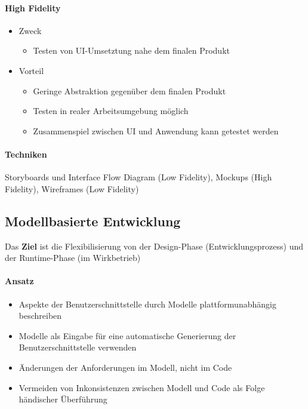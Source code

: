\documentclass
[
	8pt,		%
	ngerman,	%
	a4paper,	%
	landscape,	%
	final		%
]{extarticle}
\begin{document}
\begin{multicols*}{4}
{\begin{multicols*}{2}
			\paragraph{High Fidelity}
			\begin{itemize}
				\item Zweck
				      \begin{itemize}[leftmargin=4pt,nolistsep]
					      \item Testen von UI-Umsetztung nahe dem finalen
					            Produkt
				      \end{itemize}
				\item Vorteil
				      \begin{itemize}[leftmargin=4pt,nolistsep]
					      \item Geringe Abstraktion gegenüber dem finalen
					            Produkt
					      \item Testen in realer Arbeitsumgebung möglich
					      \item Zusammenspiel zwischen UI und Anwendung kann
					            getestet werden
				      \end{itemize}
			\end{itemize}
		\end{multicols*}
	}
	\paragraph{Techniken} Storyboards und Interface Flow Diagram (Low Fidelity),
	Mockups (High Fidelity), Wireframes (Low Fidelity)
	\subsection{Modellbasierte Entwicklung}
	Das \textbf{Ziel} ist die Flexibilisierung von der Design-Phase
	(Entwicklungsprozess) und der Runtime-Phase (im Wirkbetrieb)
	\paragraph{Ansatz}
	\begin{itemize}
		\item Aspekte der Benutzerschnittstelle durch Modelle
		      plattformunabhängig beschreiben
		\item Modelle als Eingabe für eine automatische Generierung der
		      Benutzerschnittstelle verwenden
		\item Änderungen der Anforderungen im Modell, nicht im Code
		\item Vermeiden von Inkonsistenzen zwischen Modell und Code als Folge
		      händischer Überführung
	\end{itemize}

\end{multicols*}
\end{document}
